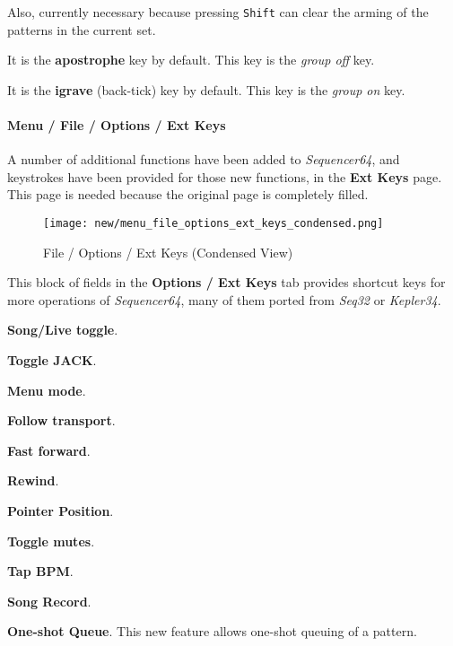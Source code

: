    Also, currently necessary because pressing \texttt{Shift} can clear the
   arming of the patterns in the current set.

   It is the \textbf{apostrophe} key by default.
   This key is the \textsl{group off} key.

   It is the \textbf{igrave} (back-tick) key by default.
   This key is the \textsl{group on} key.

\paragraph{Menu / File / Options / Ext Keys }
\label{paragraph:seq64_menu_file_options_ext_keys}

   A number of additional functions have been added to \textsl{Sequencer64},
   and keystrokes have been provided for those new functions, in the
   \textbf{Ext Keys} page.  This page is needed because the original page is
   completely filled.

\begin{figure}[H]
   \centering 
   \texttt{[image: new/menu\_file\_options\_ext\_keys\_condensed.png]}
   \caption{File / Options / Ext Keys (Condensed View)}
   \label{fig:seq64_menu_file_options_ext_keys}
\end{figure}


   This block of fields in the \textbf{Options / Ext Keys} tab
   provides shortcut keys for more operations of \textsl{Sequencer64}, many of
   them ported from \textsl{Seq32} or \textsl{Kepler34}.

   \begin{enumber}
      \item \textbf{Song/Live toggle}.
      \item \textbf{Toggle JACK}.
      \item \textbf{Menu mode}.
      \item \textbf{Follow transport}.
      \item \textbf{Fast forward}.
      \item \textbf{Rewind}.
      \item \textbf{Pointer Position}.
      \item \textbf{Toggle mutes}.
      \item \textbf{Tap BPM}.
      \item \textbf{Song Record}.
      \item \textbf{One-shot Queue}.
         This new feature allows one-shot queuing of a pattern.
   \end{enumber}

